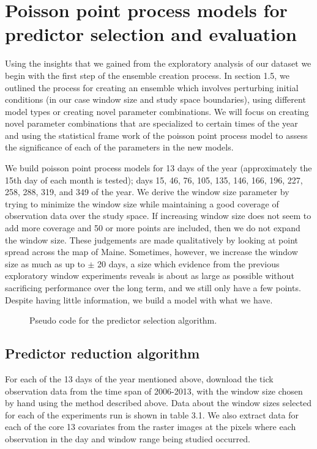 \section{Poisson point process models for predictor selection and evaluation}

Using the insights that we gained from the exploratory analysis of our dataset we begin with the first step of the ensemble creation process. In section 1.5, we outlined the process for creating an ensemble which involves perturbing initial conditions (in our case window size and study space boundaries), using different model types or creating novel parameter combinations. We will focus on creating novel parameter combinations that are specialized to certain times of the year and using the statistical frame work of the poisson point process model to assess the significance of each of the parameters in the new models. \newline

\noindent We build poisson point process models for 13 days of the year (approximately the 15th day of each month is tested); days 15, 46, 76, 105, 135, 146, 166, 196, 227, 258, 288, 319, and 349 of the year. We derive the window size parameter by trying to minimize the window size while maintaining a good coverage of observation data over the study space. If increasing window size does not seem to add more coverage and 50 or more points are included, then we do not expand the window size. These judgements are made qualitatively by looking at point spread across the map of Maine. Sometimes, however, we increase the window size as much as up to $\pm$ 20 days, a size which evidence from the previous exploratory window experiments reveals is about as large as possible without sacrificing performance over the long term, and we still only have a few points. Despite having little information, we build a model with what we have.  \newline

\begin{figure} [!ht]
\centerline{}
\caption{Pseudo code for the predictor selection algorithm. }
\label{fig6}
\end{figure}
\subsection{ Predictor reduction algorithm}

For each of the 13 days of the year mentioned above, download the tick observation data from the time span of 2006-2013, with the window size chosen by hand using the method described above. Data about the window sizes selected for each of the experiments run is shown in table 3.1. We also extract data for each of the core 13 covariates from the raster images at the pixels where each observation in the day and window range being studied occurred. \newline

